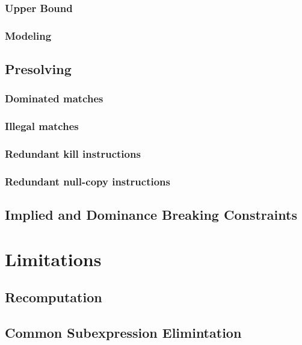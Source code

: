\subsubsection{Upper Bound}
\subsubsection{Modeling}

\subsection{Presolving}
\subsubsection{Dominated matches}
\subsubsection{Illegal matches}
\subsubsection{Redundant kill instructions}
\subsubsection{Redundant null-copy instructions}

\subsection{Implied and Dominance Breaking Constraints}

\section{Limitations}
\subsection{Recomputation}
\subsection{Common Subexpression Elimintation}
